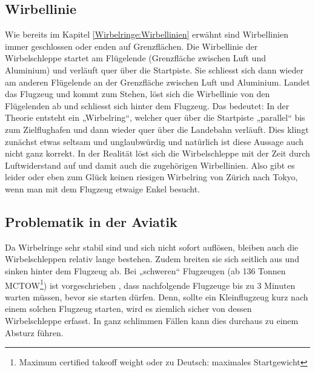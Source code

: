 \subsection{Wirbellinie}
Wie bereits im Kapitel \ref{Wirbelringe:Wirbellinien} erwähnt sind Wirbellinien immer geschlossen oder enden auf Grenzflächen.
Die Wirbellinie der Wirbelschleppe startet am Flügelende (Grenzfläche zwischen Luft und Aluminium) und verläuft quer über die Startpiste.
Sie schliesst sich dann wieder am anderen Flügelende an der Grenzfläche zwischen Luft und Aluminium.
Landet das Flugzeug und kommt zum Stehen, löst sich die Wirbellinie von den Flügelenden ab und schliesst sich hinter dem Flugzeug.
Das bedeutet: In der Theorie entsteht ein „Wirbelring“, welcher quer über die Startpiste „parallel“ bis zum Zielflughafen und dann wieder quer über die Landebahn verläuft.
Dies klingt zunächst etwas seltsam und unglaubwürdig und natürlich ist diese Aussage auch nicht ganz korrekt.
In der Realität löst sich die Wirbelschleppe mit der Zeit durch Luftwiderstand auf und damit auch die zugehörigen Wirbellinien.
Also gibt es leider oder eben zum Glück keinen riesigen Wirbelring von Zürich nach Tokyo, wenn man mit dem Flugzeug etwaige Enkel besucht.



\subsection{Problematik in der Aviatik}
Da Wirbelringe sehr stabil sind und sich nicht sofort auflösen, bleiben auch die Wirbelschleppen relativ lange bestehen.
Zudem breiten sie sich seitlich aus und sinken hinter dem Flugzeug ab.
Bei „schweren“ Flugzeugen (ab 136 Tonnen MCTOW\footnote{Maximum certified takeoff weight oder zu Deutsch: maximales Startgewicht}) ist vorgeschrieben \cite{Wirbelringe:WakeTurbulence}, dass nachfolgende Flugzeuge bis zu 3 Minuten warten müssen, bevor sie starten dürfen.
Denn, sollte ein Kleinflugzeug kurz nach einem solchen Flugzeug starten, wird es ziemlich sicher von dessen Wirbelschleppe erfasst.
In ganz schlimmen Fällen kann dies durchaus zu einem Absturz führen.

